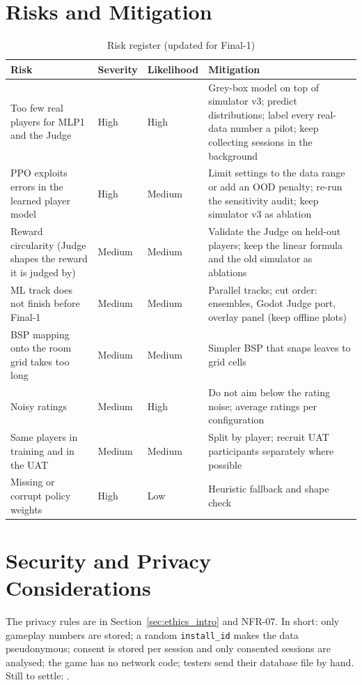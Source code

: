 \section{Risks and Mitigation}
\label{sec:risk}
\begin{table}[!htbp]
\centering
\caption{Risk register (updated for Final-1)}
\label{tab:risk_matrix}
\scriptsize
\begin{tabular}{p{}p{}p{}p{}}
\toprule
\textbf{Risk} & \textbf{Severity} & \textbf{Likelihood} & \textbf{Mitigation} \\
\midrule
Too few real players for MLP1 and the Judge & High & High & Grey-box model on top of simulator v3; predict distributions; label every real-data number a pilot; keep collecting sessions in the background \\
\midrule
PPO exploits errors in the learned player model & High & Medium & Limit settings to the data range or add an OOD penalty; re-run the sensitivity audit; keep simulator v3 as ablation \\
\midrule
Reward circularity (Judge shapes the reward it is judged by) & Medium & Medium & Validate the Judge on held-out players; keep the linear formula and the old simulator as ablations \\
\midrule
ML track does not finish before Final-1 & Medium & Medium & Parallel tracks; cut order: ensembles, Godot Judge port, overlay panel (keep offline plots) \\
\midrule
BSP mapping onto the room grid takes too long & Medium & Medium & Simpler BSP that snaps leaves to grid cells \\
\midrule
Noisy ratings & Medium & High & Do not aim below the rating noise; average ratings per configuration \\
\midrule
Same players in training and in the UAT & Medium & Medium & Split by player; recruit UAT participants separately where possible \\
\midrule
Missing or corrupt policy weights & High & Low & Heuristic fallback and shape check \\
\bottomrule
\end{tabular}
\end{table}

\section{Security and Privacy Considerations}
\label{sec:ethics}
The privacy rules are in Section~\ref{sec:ethics_intro} and NFR-07. In short: only gameplay numbers are stored; a random \texttt{install\_id} makes the data pseudonymous; consent is stored per session and only consented sessions are analysed; the game has no network code; testers send their database file by hand. Still to settle: .

